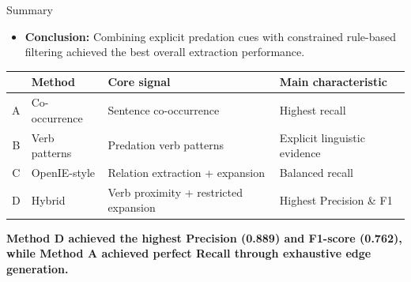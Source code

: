 \documentclass[aspectratio=169,11pt]{beamer}
\begin{document}
\begin{frame}{Summary}
  \small

  \begin{itemize}
    \item \textbf{Conclusion:} Combining explicit predation cues with constrained rule-based filtering achieved the best overall extraction performance.
  \end{itemize}

  \begin{center}
  \begin{tabular}{clll}
    \toprule
    & \textbf{Method} & \textbf{Core signal} & \textbf{Main characteristic} \\
    \midrule
    A & Co-occurrence  & Sentence co-occurrence          & Highest recall \\
    B & Verb patterns  & Predation verb patterns         & Explicit linguistic evidence \\
    C & OpenIE-style   & Relation extraction + expansion & Balanced recall \\
    D & Hybrid         & Verb proximity + restricted expansion & Highest Precision \& F1 \\
    \bottomrule
  \end{tabular}
  \end{center}

  \vspace{0.6em}

  \centering
  \textbf{Method D achieved the highest Precision (0.889) and F1-score (0.762), while Method A achieved perfect Recall through exhaustive edge generation.}

\end{frame}

\end{document}
